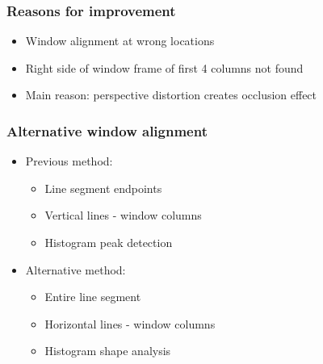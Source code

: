 \documentclass{beamer}
\begin{document}


\frame
{
	\frametitle{Reasons for improvement}
	\begin{itemize}
	\item Window alignment at wrong locations
	\item Right side of window frame of first 4 columns not found
	\item Main reason: perspective distortion creates occlusion effect
	\end{itemize}
}

\frame
{
}

\frame
{
	\frametitle{Alternative window alignment}
	\begin{itemize}
	\item <+-| alert@+> Previous method: 
		\begin{itemize}
		\item <+-| alert@+> Line segment endpoints
		\item <+-| alert@+> Vertical lines - window columns
		\item <+-| alert@+> Histogram peak detection
		\end{itemize}
	\item <+-| alert@+> Alternative method: 
		\begin{itemize}
		\item <+-| alert@+> Entire line segment
		\item <+-| alert@+> Horizontal lines - window columns
		\item <+-| alert@+> Histogram shape analysis
		\end{itemize}
	\end{itemize}
}
\end{document}
